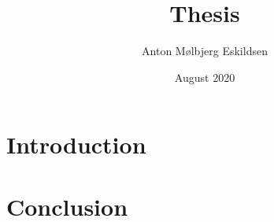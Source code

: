 \documentclass{report}
\title{Thesis}
\author{Anton Mølbjerg Eskildsen}
\date{August 2020}
\begin{document}
\maketitle

\tableofcontents

\chapter{Introduction}
\chapter{Conclusion}
\end{document}
